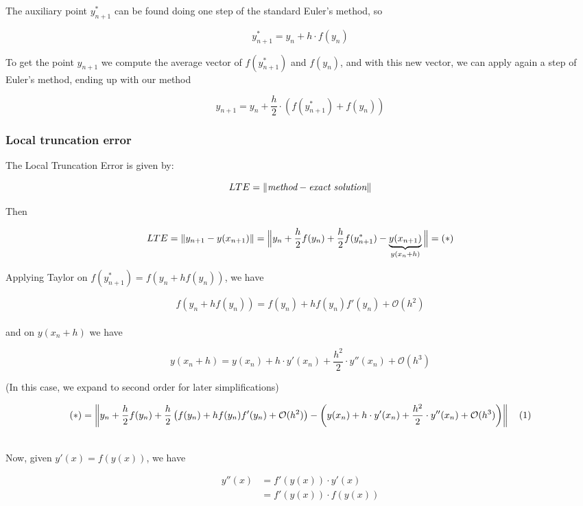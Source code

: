 The auxiliary point $y_{n+1}^*$ can be found doing one step of the standard Euler's method, so 

\[
  y_{n+1}^* = y_n + h\cdot f(y_n)
\]
\vspace{0.01cm}

To get the point $y_{n+1}$ we compute the average vector of $f(y_{n+1}^*)$ and $f(y_n)$, and with this new vector, we can apply again a step of Euler's method, ending up with our method

\[
  \boxed{y_{n+1} = y_n + \frac{h}{2}\cdot \left(f(y_{n+1}^*) + f(y_n)\right)}
\]
\newpage

\subsubsection{Local truncation error}

The Local Truncation Error is given by:

\[
  LTE = \left\lVert\textit{method} - \textit{exact solution}\right\rVert
\]

Then

\[
  LTE = \left\lVert y_{n+1} - y(x_{n+1})\right\rVert = \Big\rVert y_n + \frac{h}{2}f(y_n) + \frac{h}{2}f(y_{n+1}^*) - \underbrace{y(x_{n+1})}_{y(x_n + h)}\Big\rVert = (*)
\]

Applying Taylor on $f(y_{n+1}^*) = f\left(y_n + hf(y_n)\right)$, we have

\[
  f\left(y_n + hf(y_n)\right) = f(y_n) + hf(y_n)f'(y_n) + \mathcal{O}(h^2)
\]
\\
and on $y(x_n +h)$ we have

\[
  y(x_n + h) = y(x_n) + h\cdot y'(x_n) + \frac{h^2}{2}\cdot y''(x_n) + \mathcal{O}(h^3)
\]

(In this case, we expand to second order for later simplifications)

\footnotesize

\[
    (*) = \left\lVert y_n + \frac{h}{2}f(y_n) + \frac{h}{2}\left(f(y_n) + hf(y_n)f'(y_n) + \mathcal{O}(h^2) \right) - \left(y(x_n) + h\cdot y'(x_n) + \frac{h^2}{2}\cdot y''(x_n) + \mathcal{O}(h^3) \right)\right\rVert \quad (1)
\]

\normalsize
\-\\
Now, given $y'(x) = f(y(x))$, we have

\vspace{-0.5cm}

\begin{align*}
    y''(x) &= f'(y(x))\cdot y'(x) \\
           &= f'(y(x)) \cdot f(y(x))
\end{align*}

